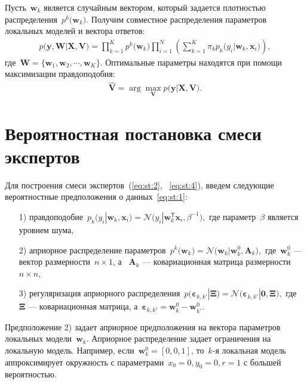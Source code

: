 \documentclass[12pt, twoside]{article}
\numberwithin{equation}{section}
\begin{document}
Пусть~$\textbf{w}_k$ является случайным вектором, который задается плотностью распределения~$p^{k}\bigr(\mathbf{w}_k\bigr)$. Получим совместное распределения параметров локальных моделей и вектора ответов:
\[
\label{eq:st:4}
\begin{aligned}
p\bigr(\mathbf{y}, \mathbf{W}|\mathbf{X}, \mathbf{V}\bigr) = \prod_{k=1}^{K}p^{k}\bigr(\mathbf{w}_k\bigr)\prod_{i=1}^{N}\left(\sum_{k=1}^{K}\pi_{k}p_{k}\bigr(y_i|\mathbf{w}_k, \mathbf{x}_i\bigr)\right),
\end{aligned}
\]
где~$\mathbf{W} = \bigr\{\mathbf{w}_1, \mathbf{w}_2, \cdots, \mathbf{w}_K\bigr\}.$
Оптимальные параметры находятся при помощи максимизации правдоподобия:
\[
\label{eq:st:5}
\begin{aligned}
\hat{\mathbf{V}} = \arg\max_{\mathbf{V}} p\bigr(\mathbf{y}|\mathbf{X}, \mathbf{V}\bigr).
\end{aligned}
\]

\section{Вероятностная постановка смеси экспертов}
Для построения смеси экспертов~(\ref{eq:st:2}, ~\ref{eq:st:4}), введем следующие вероятностные предположения о данных~\eqref{eq:st:1}:

\begin{enumerate}
	\item[1)] правдоподобие~$p_{k}\bigr(y_{i}|\mathbf{w}_{k}, \mathbf{x}_{i}\bigr) = \mathcal{N}\bigr(y_{i}|\mathbf{w}_{k}^{\mathsf{T}}\mathbf{x}_{i}, \beta^{-1}\bigr),$ где параметр~$\beta$ является уровнем шума,
	\item[2)] априорное распределение параметров~$p^{k}\bigr(\mathbf{w}_{k}\bigr) = \mathcal{N}\bigr(\mathbf{w}_{k}|\mathbf{w}^{0}_{k}, \mathbf{A}_{k}\bigr),$ где~$\mathbf{w}^{0}_{k}$ --- вектор размерности~$n\times1$, а ~$\mathbf{A}_{k}$ --- ковариационная матрица размерности~$n\times n$,
	\item[3)] регуляризация априорного распределения~$p\bigr(\bm{\varepsilon}_{k,k'}|\bm{\Xi}\bigr) = \mathcal{N}\bigr(\bm{\varepsilon}_{k,k'}|\mathbf{0},  \bm{\Xi}\bigr),$ где~$\bm{\Xi}$ --- ковариационная матрица, а~$\bm{\varepsilon}_{k,k'} = \mathbf{w}_{k}^{0}-\mathbf{w}_{k'}^{0}.$
\end{enumerate}
Предположение 2) задает априорное предположения на вектора параметров локальных модели~$\textbf{w}_k$. Априорное распределение  задает ограничения на локальную модель. Например, если~$\textbf{w}_k^{0} = [0,0,1]$, то~$k$-я локальная модель аппроксимирует окружность с параметрами~$x_0=0, y_0=0, r=1$ с большей вероятностью.
\end{document}
